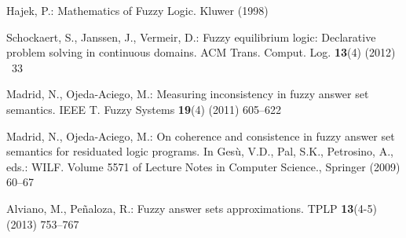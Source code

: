 \documentclass[runningheads]{llncs}
\begin{document}
\begin{thebibliography}{10}
Hajek, P.:
\newblock Mathematics of Fuzzy Logic.
\newblock Kluwer (1998)

Schockaert, S., Janssen, J., Vermeir, D.:
\newblock Fuzzy equilibrium logic: Declarative problem solving in continuous
  domains.
\newblock ACM Trans. Comput. Log. \textbf{13}(4) (2012) ~33

Madrid, N., Ojeda-Aciego, M.:
\newblock Measuring inconsistency in fuzzy answer set semantics.
\newblock IEEE T. Fuzzy Systems \textbf{19}(4) (2011)  605--622

Madrid, N., Ojeda-Aciego, M.:
\newblock On coherence and consistence in fuzzy answer set semantics for
  residuated logic programs.
\newblock In Ges{\`u}, V.D., Pal, S.K., Petrosino, A., eds.: WILF. Volume 5571
  of Lecture Notes in Computer Science., Springer (2009)  60--67

Alviano, M., Pe{\~n}aloza, R.:
\newblock Fuzzy answer sets approximations.
\newblock TPLP \textbf{13}(4-5) (2013)  753--767

\end{thebibliography}



%
\end{document}
